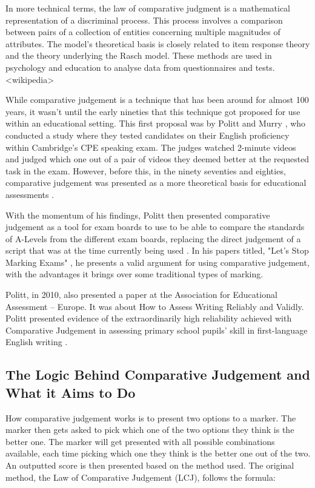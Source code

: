 		In more technical terms, the law of comparative judgment is a mathematical representation of a discriminal process. This process involves a comparison between pairs of a collection of entities concerning multiple magnitudes of attributes. The model's theoretical basis is closely related to item response theory and the theory underlying the Rasch model. These methods are used in psychology and education to analyse data from questionnaires and tests.
		<wikipedia>
		
		While comparative judgement is a technique that has been around for almost 100 years, it wasn't until the early nineties that this technique got proposed for use within an educational setting. This first proposal was by Politt and Murry \cite{pollitt1996raters}, who conducted a study where they tested candidates on their English proficiency within Cambridge's CPE speaking exam. The judges watched 2-minute videos and judged which one out of a pair of videos they deemed better at the requested task in the exam. However, before this, in the ninety seventies and eighties, comparative judgement was presented as a more theoretical basis for educational assessments \cite{andrich1978rating}. 
		
		With the momentum of his findings, Politt then presented comparative judgement as a tool for exam boards to use to be able to compare the standards of A-Levels from the different exam boards, replacing the direct judgement of a script that was at the time currently being used \cite{newton2007paired}. In his papers titled, "Let's Stop Marking Exams" \cite{stop_marking_pollitt}, he presents a valid argument for using comparative judgement, with the advantages it brings over some traditional types of marking.
		
		Politt, in 2010, also presented a paper at the Association for Educational Assessment – Europe. It was about How to Assess Writing Reliably and Validly. Politt presented evidence of the extraordinarily high reliability achieved with Comparative Judgement in assessing primary school pupils' skill in first-language English writing \cite{pollitt2009abolishing}.
		
	\subsection{The Logic Behind Comparative Judgement and What it Aims to Do} %
		How comparative judgement works is to present two options to a marker. The marker then gets asked to pick which one of the two options they think is the better one. The marker will get presented with all possible combinations available, each time picking which one they think is the better one out of the two. An outputted score is then presented based on the method used. The original method, the Law of Comparative Judgement (LCJ), follows the formula:
		
